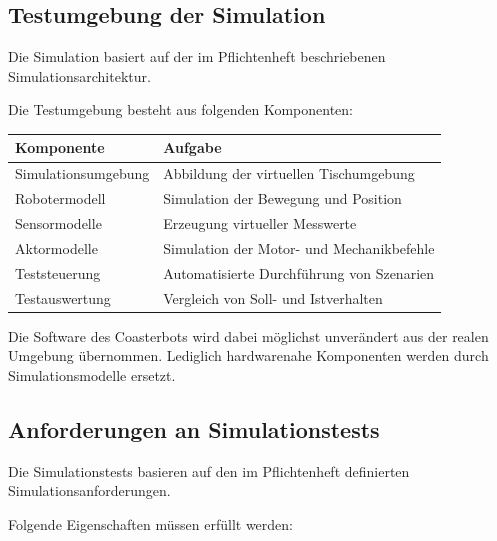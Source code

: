 \subsection{Testumgebung der
Simulation}\label{testumgebung-der-simulation}

Die Simulation basiert auf der im Pflichtenheft beschriebenen
Simulationsarchitektur.

Die Testumgebung besteht aus folgenden Komponenten:

\begin{longtable}[]{@{}ll@{}}
\toprule\noalign{}
Komponente & Aufgabe \\
\midrule\noalign{}
\endhead
\bottomrule\noalign{}
\endlastfoot
Simulationsumgebung & Abbildung der virtuellen Tischumgebung \\
Robotermodell & Simulation der Bewegung und Position \\
Sensormodelle & Erzeugung virtueller Messwerte \\
Aktormodelle & Simulation der Motor- und Mechanikbefehle \\
Teststeuerung & Automatisierte Durchführung von Szenarien \\
Testauswertung & Vergleich von Soll- und Istverhalten \\
\end{longtable}

Die Software des Coasterbots wird dabei möglichst unverändert aus der
realen Umgebung übernommen. Lediglich hardwarenahe Komponenten werden
durch Simulationsmodelle ersetzt.

\subsection{Anforderungen an
Simulationstests}\label{anforderungen-an-simulationstests}

Die Simulationstests basieren auf den im Pflichtenheft definierten
Simulationsanforderungen.

Folgende Eigenschaften müssen erfüllt werden:

